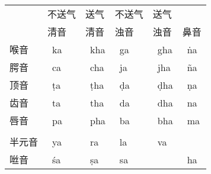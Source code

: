 \documentclass[17pt]{beamer}
\newcommand{\skt}[1]{{\sanskritfont{#1}}} %
\newcommand{\skttrans}[1]{{\skt{#1}~#1}}  %
\begin{document}
\begin{frame}{\insertsubsection }
  \small
    \begin{tabular}{@{}llllll@{}} %
     & 不送气  & 送气 & 不送气 & 送气 &   \\
     & 清音  & 清音 & 浊音 & 浊音 & 鼻音  \\
    喉音  & \skttrans{ka}  & \skttrans{kha} & \skttrans{ga} & \skttrans{gha} & \skttrans{ṅa} \\
    腭音  & \skttrans{ca}  & \skttrans{cha} & \skttrans{ja} & \skttrans{jha} & \skttrans{ña} \\
    顶音  & \skttrans{ṭa}  & \skttrans{ṭha} & \skttrans{ḍa} & \skttrans{ḍha} & \skttrans{ṇa} \\
    齿音  & \skttrans{ta}  & \skttrans{tha} & \skttrans{da} & \skttrans{dha} & \skttrans{na} \\
    唇音  & \skttrans{pa}  & \skttrans{pha} & \skttrans{ba} & \skttrans{bha} & \skttrans{ma} \\
      &  & &  & &   \\
    半元音  & \skttrans{ya}  & \skttrans{ra} & \skttrans{la} & \skttrans{va} &  \\
    咝音  & \skttrans{śa}  & \skttrans{ṣa} & \skttrans{sa} &  & \skttrans{ha} \\
    \end{tabular}
\end{frame}

\begin{frame}
\end{frame} %
\end{document}
